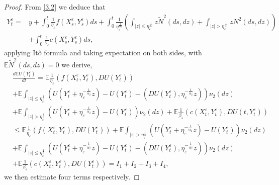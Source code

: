 \documentclass[11pt,reqno]{amsart}
\numberwithin{equation}{section}
\begin{document}
\begin{proof}
	
	From \eqref{3.2} we deduce that 
	\begin{equation}
		\begin{split}
			Y_{t}^{\varepsilon}=&y+\int_{0}^{t}\frac{1}{\eta_{\varepsilon}}f(X_{s}^{\varepsilon},Y_{s}^{\varepsilon})ds+\int_{0}^{t}\frac{1}{\eta_{\varepsilon}^{\frac{1}{\alpha_{2}}}}\left( \int_{|z|\leq \eta_{\varepsilon}^{\frac{1}{\alpha_{2}}}}z \tilde{N}^{2}(ds,dz)+\int_{|z|> \eta_{\varepsilon}^{\frac{1}{\alpha_{2}}}}zN^{2}(ds,dz)\right)\\
		&+\int_{0}^{t}\frac{1}{\beta_{\varepsilon}}c(X_{s}^{\varepsilon},Y_{s}^{\varepsilon})ds, 
		\end{split}\nonumber
	\end{equation}
	applying It\^{o} formula and taking expectation on both sides, with $\mathbb{E}\tilde{N}^{2}(ds,dz)=0$ we derive,
	\begin{align}
		&\frac{d\mathbb{E}U(Y_{t}^{\varepsilon})}{dt}=\mathbb{E} \frac{1}{\eta_{\varepsilon}}( f(X_{t}^{\varepsilon},Y_{t}^{\varepsilon}),DU(Y_{t}^{\varepsilon}))\nonumber \\
		&+\mathbb{E} \int_{|z|\leq \eta_{\varepsilon}^{\frac{1}{\alpha}}}\left( U(Y_{t}^{\varepsilon}+\eta_{\varepsilon}^{-\frac{1}{\alpha_{2}}}z)-U(Y_{t}^{\varepsilon})-( DU(Y_{t}^{\varepsilon}), \eta_{\varepsilon}^{-\frac{1}{\alpha_{2}}}z) \right) \nu_{2}(dz)\nonumber\\
		&+\mathbb{E} \int_{|z|> \eta_{\varepsilon}^{\frac{1}{\alpha}}}\left( U(Y_{t}^{\varepsilon}+\eta_{\varepsilon}^{-\frac{1}{\alpha_{2}}}z)-U(Y_{t}^{\varepsilon}) \right) \nu_{2}(dz)+\mathbb{E} \frac{1}{\beta_{\varepsilon}}( c(X_{t}^{\varepsilon},Y_{t}^{\varepsilon}),DU(t,Y_{t}^{\varepsilon}))\nonumber \\
		&\leq \mathbb{E} \frac{1}{\eta_{\varepsilon}}( f(X_{t}^{\varepsilon},Y_{t}^{\varepsilon}),DU(Y_{t}^{\varepsilon})) +\mathbb{E} \int_{|z|> \eta_{\varepsilon}^{\frac{1}{\alpha}}}\left( U(Y_{t}^{\varepsilon}+\eta_{\varepsilon}^{-\frac{1}{\alpha_{2}}}z)-U(Y_{t}^{\varepsilon}) \right) \nu_{2}(dz)\nonumber\\
		&+\mathbb{E} \int_{|z|\leq \eta_{\varepsilon}^{\frac{1}{\alpha}}}\left( U(Y_{t}^{\varepsilon}+\eta_{\varepsilon}^{-\frac{1}{\alpha_{2}}}z)-U(Y_{t}^{\varepsilon})-(DU(Y_{t}^{\varepsilon}), \eta_{\varepsilon}^{-\frac{1}{\alpha_{2}}}z ) \right) \nu_{2}(dz)\nonumber\\
		&+\mathbb{E} \frac{1}{\beta_{\varepsilon}}\left(  c(X_{t}^{\varepsilon},Y_{t}^{\varepsilon}),DU(Y_{t}^{\varepsilon})\right) =I_{1}+I_{2}+I_{3}+I_{4},\label{3.15}
	\end{align}
	we then estimate four terms respectively.
	

\end{proof}
\end{document}
